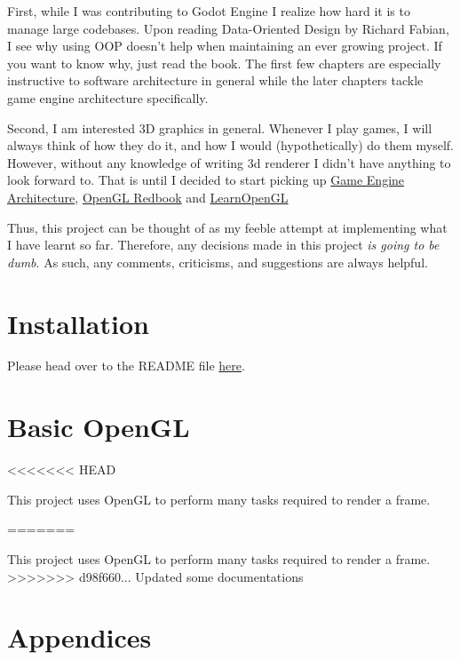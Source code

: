\documentclass[a4paper,14pt]{extbook}
\begin{document}
First, while I was contributing to Godot Engine I realize how hard it is to manage large codebases.
Upon reading Data-Oriented Design by Richard Fabian, I see why using OOP doesn't help when maintaining an ever growing project.
If you want to know why, just read the book.
The first few chapters are especially instructive to software architecture in general while the later chapters tackle game engine architecture specifically.

Second, I am interested 3D graphics in general.
Whenever I play games, I will always think of how they do it, and how I would (hypothetically) do them myself.
However, without any knowledge of writing 3d renderer I didn't have anything to look forward to.
That is until I decided to start picking up \href{https://www.amazon.ca/Game-Engine-Architecture-Jason-Gregory/dp/1568814135}{Game Engine Architecture}, \href{https://www.cs.utexas.edu/users/fussell/courses/cs354/handouts/Addison.Wesley.OpenGL.Programming.Guide.8th.Edition.Mar.2013.ISBN.0321773039.pdf}{OpenGL Redbook} and \href{https://learnopengl.com}{LearnOpenGL}

Thus, this project can be thought of as my feeble attempt at implementing what I have learnt so far.
Therefore, any decisions made in this project \textit{is going to be dumb}.
As such, any comments, criticisms, and suggestions are always helpful.

\newpage
\section{Installation}

Please head over to the README file \href{run:./../README.md}{here}.

\newpage
\section{Basic OpenGL}
<<<<<<< HEAD

This project uses OpenGL to perform many tasks required to render a frame.

=======

This project uses OpenGL to perform many tasks required to render a frame.
>>>>>>> d98f660... Updated some documentations
\section{Appendices}
\end{document}
